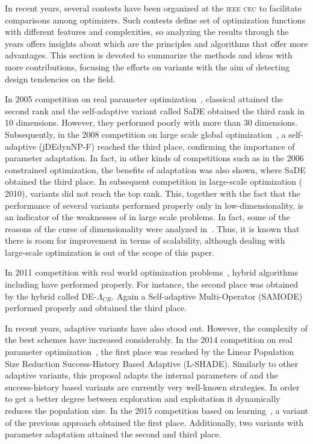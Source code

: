 In recent years, several contests have been organized at the \textsc{ieee cec} to facilitate comparisons among optimizers.
%
Such contests define set of optimization functions with different features and complexities, so analyzing the results
through the years offers insights about which are the principles and algorithms that offer more advantages.
%
This section is devoted to summarize the methods and ideas with more contributions, focusing the efforts
on \DE{} variants with the aim of detecting design tendencies on the \DE{} field. 

In \CEC{} 2005 competition on real parameter optimization~\cite{CEC2005}, classical \DE{} attained the second rank and 
the self-adaptive \DE{} variant called SaDE obtained the third rank in 10 dimensions.
%
However, they performed poorly with more than 30 dimensions.
%
Subsequently, in the 2008 competition on large scale global optimization~\cite{CEC2008}, a self-adaptive \DE{} (jDEdynNP-F) 
reached the third place, confirming the importance of parameter adaptation.
%
In fact, in other kinds of competitions such as in the 2006 constrained optimization, the benefits of adaptation 
was also shown, where SaDE obtained the third place.
%
In subsequent competition in large-scale optimization (\CEC{} 2010), \DE{} variants did not reach the top rank.
%
This, together with the fact that the performance of several \DE{} variants performed properly only in low-dimensionality, 
is an indicator of the weaknesses of \DE{} in large scale problems.
%
In fact, some of the reasons of the curse of dimensionality were analyzed in~\cite{segura2015improving}.
%
Thus, it is known that there is room for improvement in terms of scalability, although dealing with large-scale optimization is out of 
the scope of this paper.

In \CEC{} 2011 competition with real world optimization problems~\cite{CEC2011}, hybrid algorithms including \DE{} have performed
properly.
%
For instance, the second place was obtained by the hybrid \DE{} called DE-$\Lambda_{CR}$.
%
Again a Self-adaptive Multi-Operator \DE{} (SAMODE) performed properly and obtained the third place.

In recent years, adaptive variants have also stood out.
%
However, the complexity of the best schemes have increased considerably.
%
In the 2014 competition on real parameter optimization~\cite{CEC2014}, the first place was reached by the Linear Population Size 
Reduction Success-History Based Adaptive \DE{} (L-SHADE).
%
Similarly to other adaptive variants, this proposal adapts the internal parameters of \DE{} and the success-history based variants
are currently very well-known strategies.
%
In order to get a better degree between exploration and exploitation it dynamically reduces the population size.
%
In the 2015 competition based on learning~\cite{CEC2015}, a variant of the previous approach obtained the first place.
%
Additionally, two \DE{} variants with parameter adaptation attained the second and third place.

